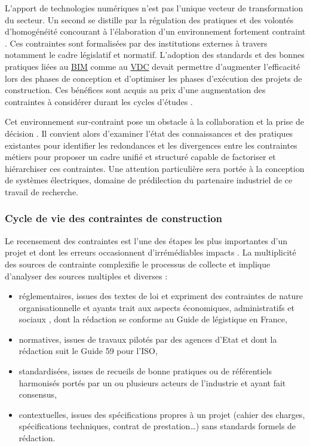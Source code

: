\documentclass[a4paper,12pt]{article}
\begin{document}
L’apport de technologies numériques n’est pas l’unique vecteur de transformation du secteur. Un second se distille par la régulation des pratiques et des volontés d'homogénéité concourant à l’élaboration d’un environnement fortement contraint \autocite{benzerafa-alilatLinflationNormativeLamplification2022a}. Ces contraintes sont formalisées par des institutions externes \autocite{artokiviniemiPREMISSRequirementsManagement2004} à travers notamment le cadre législatif et normatif. L’adoption des standards et des bonnes pratiques liées au \protect\hyperlink{gls-1}{\label{gls-1-use-8}BIM} comme au \protect\hyperlink{gls-4}{\label{gls-4-use-5}VDC} devait permettre d’augmenter l’efficacité lors des phases de conception et d’optimiser les phases d’exécution des projets de construction. Ces bénéfices sont acquis au prix d’une augmentation des contraintes à considérer durant les cycles d’études \autocite{shahruddinBIMRequirementsConstruction2020a}. 

Cet environnement sur-contraint pose un obstacle à la collaboration et la prise de décision \autocite{adriennecostaConstructionNormeLarchitecte2012}. Il convient alors d'examiner l'état des connaissances et des pratiques existantes pour identifier les redondances et les divergences entre  les contraintes métiers pour proposer un cadre unifié et structuré capable de factoriser et hiérarchiser ces contraintes. Une attention particulière sera portée à la conception de systèmes électriques, domaine de prédilection du partenaire industriel de ce travail de recherche.
\subsubsection{Cycle de vie des contraintes de construction}
\label{sec:orgfa4f9b6}
Le recensement des contraintes est l’une des étapes les plus importantes d’un projet et dont les erreurs occasionnent d’irrémédiables impacts \autocite{mabeloRequirementsManagementProject2025a}. La multiplicité des sources de contrainte complexifie le processus de collecte et implique d’analyser des sources multiples et diverses : 
\begin{itemize}
\item réglementaires, issues des textes de loi et expriment des contraintes de nature organisationnelle et ayants trait aux aspects économiques, administratifs et sociaux \autocite{devinazRapportDinformationFait2023}, dont la rédaction se conforme au Guide de légistique \autocite{GuideLegistique2017a} en France,
\item normatives, issues de travaux pilotés par des agences d’Etat et dont la rédaction suit le Guide 59 \autocite{PratiquesNormalisationRecommandees2019a} pour l’ISO,
\item standardisées, issues de recueils de bonne pratiques ou de référentiels harmonisés portés par un ou plusieurs acteurs de l’industrie et ayant fait consensus,
\item contextuelles, issues des spécifications propres à un projet (cahier des charges, spécifications techniques, contrat de prestation\ldots{}) sans standards formels de rédaction.
\end{itemize}
\end{document}
